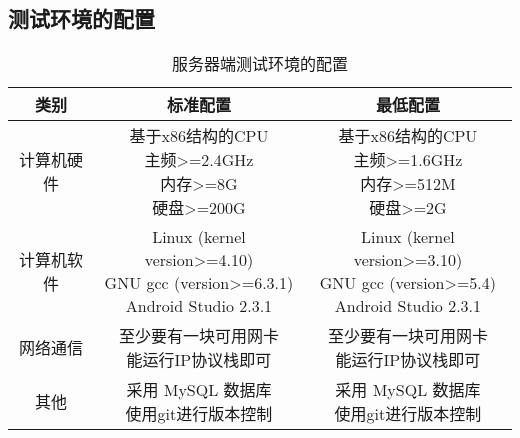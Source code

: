 \subsection{测试环境的配置}
\begin{table}[htbp]
	\centering
	\caption{服务器端测试环境的配置} \label{tab:test-environment}
	\begin{tabular}{|c|c|c|}
		\hline
		类别 & 标准配置 & 最低配置 \\
		\hline
		计算机硬件 & \tabincell{c}{基于x86结构的CPU\\ 主频>=2.4GHz\\ 内存>=8G\\ 硬盘>=200G } & \tabincell{c}{基于x86结构的CPU\\ 主频>=1.6GHz\\ 内存>=512M\\ 硬盘>=2G} \\
		\hline
		计算机软件 & \tabincell{c}{Linux (kernel version>=4.10)\\ GNU gcc (version>=6.3.1)\\Android Studio 2.3.1 } & \tabincell{c}{Linux (kernel version>=3.10)\\ GNU gcc (version>=5.4)\\Android Studio 2.3.1} \\
		\hline
		网络通信 & \tabincell{c}{至少要有一块可用网卡\\ 能运行IP协议栈即可} & \tabincell{c}{至少要有一块可用网卡\\ 能运行IP协议栈即可} \\
		\hline
		其他 & \tabincell{c}{采用 MySQL 数据库\\ 使用git进行版本控制} & \tabincell{c}{采用 MySQL 数据库\\ 使用git进行版本控制} \\
		\hline
	\end{tabular}
\end{table}

